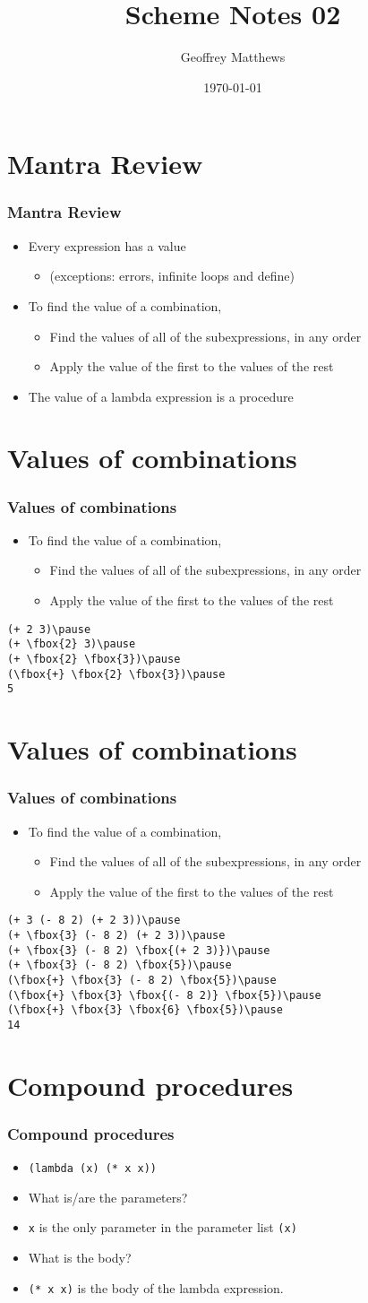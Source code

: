\documentclass{beamer}
\title
{
Scheme Notes 02
}
\subtitle{
} %
\author[Geoffrey Matthews]
{Geoffrey Matthews}
\institute[WWU/CS]
{
  Department of Computer Science\\
  Western Washington University
}
\date{\today}
\newcommand{\bi}{\begin{itemize}}
\newcommand{\ii}{\item}
\newcommand{\ei}{\end{itemize}}
\newcommand{\sect}[1]{
\section{#1}
\begin{frame}[fragile]\frametitle{#1}
}
\begin{document}
\begin{frame}
  \titlepage
\end{frame}


\newcommand{\myref}[1]{\small\item\url{#1}}
\newcommand{\myreft}[1]{\footnotesize\item\url{#1}}


\sect{Mantra Review}

\bi
\ii
Every expression has a value
\bi\ii(exceptions: errors, infinite loops and define)\ei
\ii
To find the value of a combination,
\bi
\ii
Find the values of all of the subexpressions, in any order
\ii
Apply the value of the first to the values of the rest
\ei
\ii
The value of a lambda expression is a procedure
\ei
\end{frame}

\sect{Values of combinations}
\bi
\ii
To find the value of a combination,
\bi
\ii
Find the values of all of the subexpressions, in any order
\ii
Apply the value of the first to the values of the rest
\ei
\ei
\begin{Verbatim}[commandchars=\\\{\}]
(+ 2 3)\pause
(+ \fbox{2} 3)\pause
(+ \fbox{2} \fbox{3})\pause
(\fbox{+} \fbox{2} \fbox{3})\pause
5
\end{Verbatim}
\end{frame}




\sect{Values of combinations}
\bi
\ii
To find the value of a combination,
\bi
\ii
Find the values of all of the subexpressions, in any order
\ii
Apply the value of the first to the values of the rest
\ei
\ei
\begin{Verbatim}[commandchars=\\\{\}]
(+ 3 (- 8 2) (+ 2 3))\pause
(+ \fbox{3} (- 8 2) (+ 2 3))\pause
(+ \fbox{3} (- 8 2) \fbox{(+ 2 3)})\pause
(+ \fbox{3} (- 8 2) \fbox{5})\pause
(\fbox{+} \fbox{3} (- 8 2) \fbox{5})\pause
(\fbox{+} \fbox{3} \fbox{(- 8 2)} \fbox{5})\pause
(\fbox{+} \fbox{3} \fbox{6} \fbox{5})\pause
14
\end{Verbatim}

\end{frame}


\sect{Compound procedures}

\bi
\ii\verb|(lambda (x) (* x x))|
\ii
What is/are the parameters? \pause
\ii
\verb|x| is the only parameter in the parameter list \verb|(x)|\pause
\ii
What is the body?\pause
\ii
\verb|(* x x)| is the body of the lambda expression.
\ei
\end{frame}
\end{document}
